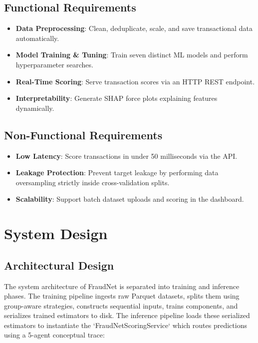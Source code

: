\subsection{Functional Requirements}
\begin{itemize}
    \item \textbf{Data Preprocessing}: Clean, deduplicate, scale, and save transactional data automatically.
    \item \textbf{Model Training \& Tuning}: Train seven distinct ML models and perform hyperparameter searches.
    \item \textbf{Real-Time Scoring}: Serve transaction scores via an HTTP REST endpoint.
    \item \textbf{Interpretability}: Generate SHAP force plots explaining features dynamically.
\end{itemize}

\subsection{Non-Functional Requirements}
\begin{itemize}
    \item \textbf{Low Latency}: Score transactions in under 50 milliseconds via the API.
    \item \textbf{Leakage Protection}: Prevent target leakage by performing data oversampling strictly inside cross-validation splits.
    \item \textbf{Scalability}: Support batch dataset uploads and scoring in the dashboard.
\end{itemize}

\section{System Design}

\subsection{Architectural Design}
The system architecture of FraudNet is separated into training and inference phases.
The training pipeline ingests raw Parquet datasets, splits them using group-aware strategies, constructs sequential inputs, trains components, and serializes trained estimators to disk. 
The inference pipeline loads these serialized estimators to instantiate the `FraudNetScoringService` which routes predictions using a 5-agent conceptual trace:

